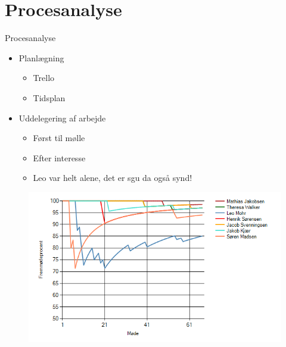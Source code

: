 
\section{Procesanalyse}
\begin{frame}{Procesanalyse}{}
	\begin{itemize}
		\item Planlægning
        \begin{itemize}
            \item Trello
            \item Tidsplan
        \end{itemize}
		\item Uddelegering af arbejde
        \begin{itemize}
            \item Først til mølle
            \item Efter interesse
            \item Leo var helt alene, det er sgu da også synd!
        \end{itemize}
	\end{itemize}
  
  \begin{figure}
    \centering
    \includegraphics[width=.6\textwidth]{figures/graph.png}
  \end{figure}
  
\end{frame}



